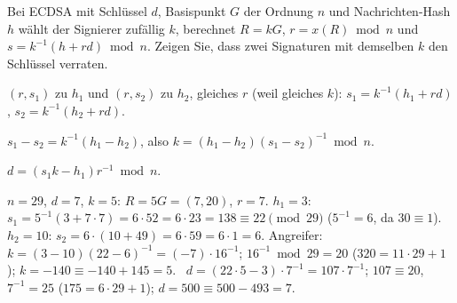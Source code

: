 \begin{aufgabe}
Bei ECDSA mit Schlüssel $d$, Basispunkt $G$ der Ordnung $n$ und Nachrichten-Hash $h$ wählt der Signierer zufällig $k$, berechnet $R = kG$, $r = x(R)\bmod n$ und $s = k^{-1}(h + rd)\bmod n$. Zeigen Sie, dass zwei Signaturen mit demselben $k$ den Schlüssel verraten.

\loesung
{}
$(r, s_1)$ zu $h_1$ und $(r, s_2)$ zu $h_2$, gleiches $r$ (weil gleiches $k$): $s_1 = k^{-1}(h_1 + rd)$, $s_2 = k^{-1}(h_2 + rd)$.

$s_1 - s_2 = k^{-1}(h_1 - h_2)$, also $k = (h_1 - h_2)(s_1 - s_2)^{-1}\bmod n$.

$d = (s_1k - h_1)r^{-1}\bmod n$.

$n = 29$, $d = 7$, $k = 5$: $R = 5G = (7, 20)$, $r = 7$. $h_1 = 3$: $s_1 = 5^{-1}(3 + 7\cdot7) = 6\cdot52 = 6\cdot23 = 138\equiv22\pmod{29}$ ($5^{-1} = 6$, da $30\equiv1$). $h_2 = 10$: $s_2 = 6\cdot(10 + 49) = 6\cdot59 = 6\cdot1 = 6$. Angreifer: $k = (3 - 10)(22 - 6)^{-1} = (-7)\cdot16^{-1}$; $16^{-1}\bmod29 = 20$ ($320 = 11\cdot29 + 1$); $k = -140\equiv-140 + 145 = 5$. \checkmark\ $d = (22\cdot5 - 3)\cdot7^{-1} = 107\cdot7^{-1}$; $107\equiv20$, $7^{-1} = 25$ ($175 = 6\cdot29 + 1$); $d = 500\equiv500 - 493 = 7$. \checkmark

\begin{center}
\begin{minipage}{0.88\textwidth}
\end{minipage}
\end{center}
\end{aufgabe}

